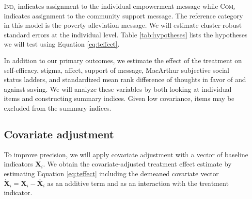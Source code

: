 \documentclass[11pt, a4paper]{article}\usepackage[]{graphicx}\usepackage[]{color}
\begin{document}
        \textsc{Ind}$_{i}$ indicates assignment to the individual empowerment message while \textsc{Com}$_{i}$ indicates assignment to the community support message. The reference category in this model is the poverty alleviation message. We will estimate cluster-robust standard errors at the individual level. Table \ref{tab:hypotheses} lists the hypotheses we will test using Equation \ref{eq:teffect}.

        \begin{table}[h]
        \centering
        \caption{Hypothesis tests}
        \label{tab:hypotheses}
        \end{table}

        In addition to our primary outcomes, we estimate the effect of the treatment on self-efficacy, stigma, affect, support of message, MacArthur subjective social status ladders, and standardized mean rank difference of thoughts in favor of and against saving. We will analyze these variables by both looking at individual items and constructing summary indices. Given low covariance, items may be excluded from the summary indices.

    \subsection{Covariate adjustment}

        To improve precision, we will apply covariate adjustment with a vector of baseline indicators $\mathbf{X}_i$. We obtain the covariate-adjusted treatment effect estimate by estimating Equation \ref{eq:teffect} including the demeaned covariate vector $\mathbf{\dot X}_{i} = \mathbf{X}_{i} - \mathbf{\bar X}_{i}$ as an additive term and as an interaction with the treatment indicator.
\end{document}
